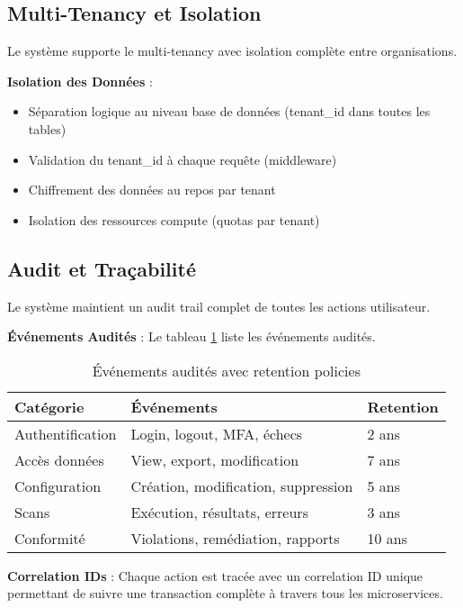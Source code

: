 \subsection{Multi-Tenancy et Isolation}

Le système supporte le multi-tenancy avec isolation complète entre organisations.

\textbf{Isolation des Données} :
\begin{itemize}
    \item Séparation logique au niveau base de données (tenant\_id dans toutes les tables)
    \item Validation du tenant\_id à chaque requête (middleware)
    \item Chiffrement des données au repos par tenant
    \item Isolation des ressources compute (quotas par tenant)
\end{itemize}

\subsection{Audit et Traçabilité}

Le système maintient un audit trail complet de toutes les actions utilisateur.

\textbf{Événements Audités} : Le tableau \ref{tab:evenements_audites} liste les événements audités.

\begin{table}[htpb]
\centering
\caption{Événements audités avec retention policies}
\label{tab:evenements_audites}
\begin{tabular}{|p{}|p{}|p{}|}
\hline
\textbf{Catégorie} & \textbf{Événements} & \textbf{Retention} \\
\hline
Authentification & Login, logout, MFA, échecs & 2 ans \\
\hline
Accès données & View, export, modification & 7 ans \\
\hline
Configuration & Création, modification, suppression & 5 ans \\
\hline
Scans & Exécution, résultats, erreurs & 3 ans \\
\hline
Conformité & Violations, remédiation, rapports & 10 ans \\
\hline
\end{tabular}
\end{table}

\textbf{Correlation IDs} : Chaque action est tracée avec un correlation ID unique permettant de suivre une transaction complète à travers tous les microservices.

